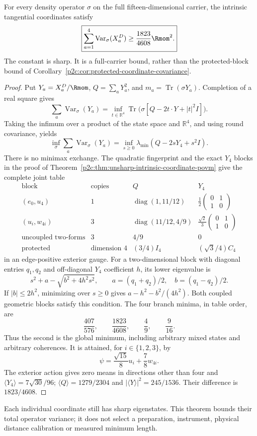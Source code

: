\documentclass[12pt,a4paper]{article}
\begin{document}
\begin{theorem}
\label{p2c:thm:intrinsic-total-variance}
For every density operator $\sigma$ on the full fifteen-dimensional carrier,
the intrinsic tangential coordinates satisfy
\[
 \boxed{\sum_{a=1}^4\operatorname{Var}_\sigma(X_a^D)
       \ge\frac{1823}{4608}\Rmom^2.}
\]
The constant is sharp.  It is a full-carrier bound, rather than the
protected-block bound of
Corollary~\ref{p2c:cor:protected-coordinate-covariance}.
\end{theorem}
\begin{proof}
Put $Y_a=X_a^D/\Rmom$, $Q=\sum_aY_a^2$, and
$m_a=\operatorname{Tr}(\sigma Y_a)$.  Completion of a real square gives
\[
 \sum_a\operatorname{Var}_\sigma(Y_a)
 =\inf_{t\in\mathbb R^4}
   \operatorname{Tr}\bigl(\sigma[Q-2t\cdot Y+|t|^2I]\bigr).
\]
Taking the infimum over a product of the state space and $\mathbb R^4$,
and using round covariance, yields
\[
 \inf_\sigma\sum_a\operatorname{Var}_\sigma(Y_a)
 =\inf_{s\ge0}\lambda_{\min}(Q-2sY_4+s^2I).
\]
There is no minimax exchange.  The quadratic fingerprint and the exact
$Y_4$ blocks in the proof of
Theorem~\ref{p2c:thm:unsharp-intrinsic-coordinate-povm} give the complete joint table
\[
\begin{array}{c|c|c|c}
 \text{block}&\text{copies}&Q&Y_4\\\hline
 (e_0,u_4)&1&\operatorname{diag}(1,11/12)
    &\tfrac12\left(\begin{smallmatrix}0&1\\1&0\end{smallmatrix}\right)\\[3pt]
 (u_i,w_{4i})&3&\operatorname{diag}(11/12,4/9)
    &\tfrac{\sqrt2}{3}\left(\begin{smallmatrix}0&1\\1&0\end{smallmatrix}\right)\\[3pt]
 \text{uncoupled two-forms}&3&4/9&0\\
 \text{protected}&\text{dimension }4&(3/4)I_4&(\sqrt3/4)C_4
\end{array}
\]
in an edge-positive exterior gauge.  For a two-dimensional block with
diagonal entries $q_1,q_2$ and off-diagonal $Y_4$ coefficient $h$, its
lower eigenvalue is
\[
 s^2+a-\sqrt{b^2+4h^2s^2},\qquad
 a=(q_1+q_2)/2,\quad b=(q_1-q_2)/2.
\]
If $|b|\le2h^2$, minimizing over $s\ge0$ gives
$a-h^2-b^2/(4h^2)$.  Both coupled geometric blocks satisfy this condition.
The four branch minima, in table order, are
\[
 \frac{407}{576},\qquad\frac{1823}{4608},\qquad
 \frac49,\qquad\frac9{16}.
\]
Thus the second is the global minimum, including arbitrary mixed states
and arbitrary coherences.  It is attained, for $i\in\{1,2,3\}$, by
\[
 \psi=\frac{\sqrt{15}}8u_i+\frac78w_{4i}.
\]
The exterior action gives zero means in directions other than four and
$\langle Y_4\rangle=7\sqrt{30}/96$;
$\langle Q\rangle=1279/2304$ and
$|\langle Y\rangle|^2=245/1536$.  Their difference is $1823/4608$.
\end{proof}
Each individual coordinate still has sharp eigenstates.  This theorem
bounds their total operator variance; it does not select a preparation,
instrument, physical distance calibration or measured minimum length.
\end{document}
